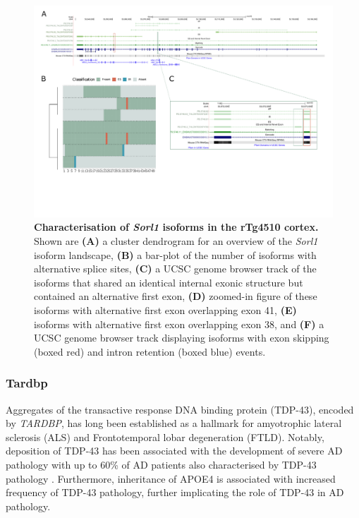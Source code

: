 \begin{landscape}
	\begin{figure}[htp]
		\centering
		\captionsetup{width=1.3\textwidth}
		\includegraphics[page=10,trim={0 0.5cm 0 0},scale = 0.8]{Figures/TargetGenes_Annotation_Landscape.pdf}
		\caption[Characterisation of the \textit{Sorl1} isoform landscape]%
		{\textbf{Characterisation of \textit{Sorl1} isoforms in the rTg4510 cortex.} Shown are \textbf{(A)} a cluster dendrogram for an overview of the \textit{Sorl1} isoform landscape, \textbf{(B)} a bar-plot of the number of isoforms with alternative splice sites, \textbf{(C)} a UCSC genome browser track of the isoforms that shared an identical internal exonic structure but contained an alternative first exon, \textbf{(D)} zoomed-in figure of these isoforms with alternative first exon overlapping exon 41, \textbf{(E)} isoforms with alternative first exon overlapping exon 38, and \textbf{(F)} a UCSC genome browser track displaying isoforms with exon skipping (boxed red) and intron retention (boxed blue) events.}    
		\label{fig:sorl1}
	\end{figure}
\end{landscape}
\restoregeometry

\newpage
\subsubsection{Tardbp}
Aggregates of the transactive response DNA binding protein (TDP-43), encoded by \textit{TARDBP}, has long been established as a hallmark for amyotrophic lateral sclerosis (ALS) and Frontotemporal lobar degeneration (FTLD)\cite{Meneses2021}. Notably, deposition of TDP-43 has been associated with the development of severe AD pathology with up to 60\% of AD patients also characterised by TDP-43 pathology \cite{Brouwers2010}. Furthermore, inheritance of APOE4 is associated with increased frequency of TDP-43 pathology, further implicating the role of TDP-43 in AD pathology\cite{Meneses2021}. 

